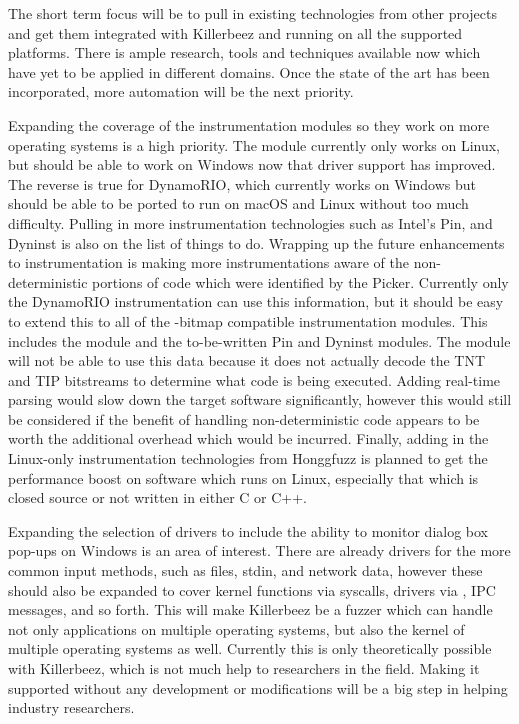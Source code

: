 The short term focus will be to pull in existing technologies from other
projects and get them integrated with Killerbeez and running on all the
supported platforms.  There is ample research, tools and techniques available
now which have yet to be applied in different domains. Once the state of the
art has been incorporated, more automation will be the next priority.

Expanding the coverage of the instrumentation modules so they work on more
operating systems is a high priority. The \IPT{} module currently only works
on Linux, but should be able to work on Windows now that driver support has
improved. The reverse is true for DynamoRIO, which currently works on Windows
but should be able to be ported to run on macOS and Linux without too much
difficulty.  Pulling in more instrumentation technologies such as Intel's Pin,
and Dyninst\cite{dyninst} is also on the list of things to do. Wrapping up the
future enhancements to instrumentation is making more instrumentations aware of
the non-deterministic portions of code which were identified by the Picker.
Currently only the DynamoRIO instrumentation can use this information, but
it should be easy to extend this to all of the \AFL{}-bitmap compatible
instrumentation modules.  This includes the \AFL{} module and the to-be-written
Pin and Dyninst modules.  The \IPT{} module will not be able to use this data
because it does not actually decode the TNT and TIP bitstreams to determine what
code is being executed. Adding real-time parsing would slow down the target
software significantly, however this would still be considered if the benefit
of handling non-deterministic code appears to be worth the additional overhead
which would be incurred. Finally, adding in the Linux-only instrumentation
technologies from Honggfuzz\cite{honggfuzz} is planned to get the performance
boost on software which runs on Linux, especially that which is closed source
or not written in either C or C++.

Expanding the selection of drivers to include the ability to monitor dialog
box pop-ups on Windows is an area of interest. There are already drivers for
the more common input methods, such as files, stdin, and network data, however
these should also be expanded to cover kernel functions via syscalls, drivers
via \IOCTLs{}, IPC messages, and so forth. This will make Killerbeez be a fuzzer
which can handle not only applications on multiple operating systems, but also
the kernel of multiple operating systems as well.  Currently this is only
theoretically possible with Killerbeez, which is not much help to researchers
in the field. Making it supported without any development or modifications
will be a big step in helping industry researchers.

